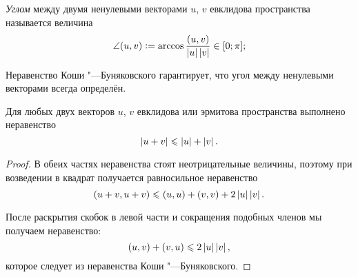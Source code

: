 \begin{definition}
    \textit{Углом} между двумя ненулевыми векторами $u$, $v$ евклидова пространства называется величина
    \[
        \angle(u, v) \vcentcolon = \arccos\frac{(u, v)}{\left\lvert u\right\rvert\left\lvert v\right\rvert} \in [0; \pi];
    \]
\end{definition}

Неравенство Коши "---Буняковского гарантирует, что угол между ненулевыми векторами всегда определён.

\begin{corollary}
    Для любых двух векторов $u$, $v$ евклидова или эрмитова пространства выполнено неравенство
    \[
        \left\lvert u + v\right\rvert \leqslant \left\lvert u\right\rvert + \left\lvert v\right\rvert.
    \]
\end{corollary}

\begin{proof}
    В обеих частях неравенства стоят неотрицательные величины, поэтому при возведении в квадрат получается равносильное неравенство
    \[
        (u + v, u + v) \leqslant (u, u) + (v, v) + 2\left\lvert u\right\rvert\left\lvert v\right\rvert.
    \]

    После раскрытия скобок в левой части и сокращения подобных членов мы получаем неравенство:
    \[
        (u, v) + (v, u) \leqslant 2\left\lvert u\right\rvert\left\lvert v\right\rvert,
    \]
    которое следует из неравенства Коши "---Буняковского.
\end{proof}

